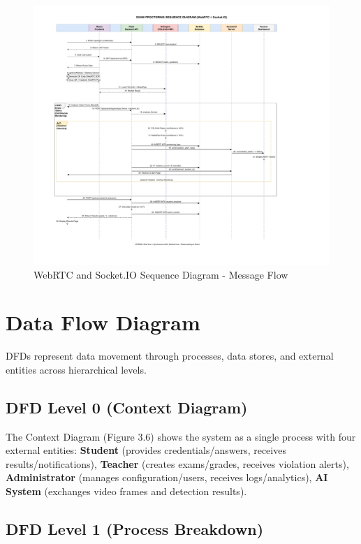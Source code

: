 \begin{figure}[ht]
    \centering
    \includegraphics[width=\textwidth]{Chap3/sequence}
    \caption{WebRTC and Socket.IO Sequence Diagram - Message Flow}
    \label{fig:sequence}
\end{figure}

\section{Data Flow Diagram}

DFDs represent data movement through processes, data stores, and external entities across hierarchical levels.

\subsection{DFD Level 0 (Context Diagram)}

The Context Diagram (Figure 3.6) shows the system as a single process with four external entities: \textbf{Student} (provides credentials/answers, receives results/notifications), \textbf{Teacher} (creates exams/grades, receives violation alerts), \textbf{Administrator} (manages configuration/users, receives logs/analytics), \textbf{AI System} (exchanges video frames and detection results).

\subsection{DFD Level 1 (Process Breakdown)}

